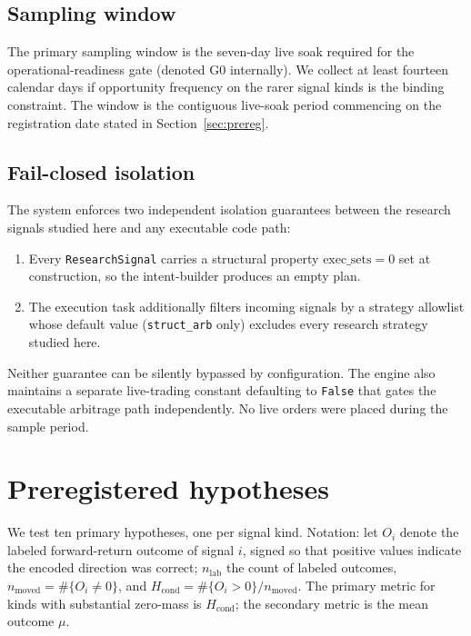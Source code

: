 \documentclass[review,12pt,authoryear]{elsarticle}
\begin{document}
\subsection{Sampling window}

The primary sampling window is the seven-day live soak required for the
operational-readiness gate (denoted G0 internally). We collect at least
fourteen calendar days if opportunity frequency on the rarer signal kinds
is the binding constraint. The window is the contiguous live-soak period
commencing on the registration date stated in Section~\ref{sec:prereg}.

\subsection{Fail-closed isolation}

The system enforces two independent isolation guarantees between the
research signals studied here and any executable code path:
\begin{enumerate}[label=(\roman*)]
\item Every \texttt{ResearchSignal} carries a structural property
\(\text{exec\_sets} = 0\) set at construction, so the intent-builder produces
an empty plan.
\item The execution task additionally filters incoming signals by a
strategy allowlist whose default value (\texttt{struct\_arb} only)
excludes every research strategy studied here.
\end{enumerate}
Neither guarantee can be silently bypassed by configuration. The engine
also maintains a separate live-trading constant defaulting to \texttt{False}
that gates the executable arbitrage path independently. No live orders
were placed during the sample period.

\section{Preregistered hypotheses}
\label{sec:hyp}

We test ten primary hypotheses, one per signal kind. Notation: let \(O_i\)
denote the labeled forward-return outcome of signal \(i\), signed so that
positive values indicate the encoded direction was correct; \(n_\text{lab}\)
the count of labeled outcomes, \(n_\text{moved} = \#\{O_i \neq 0\}\), and
\(H_\text{cond} = \#\{O_i > 0\} / n_\text{moved}\). The primary metric for
kinds with substantial zero-mass is \(H_\text{cond}\); the secondary
metric is the mean outcome \(\mu\).
\end{document}
